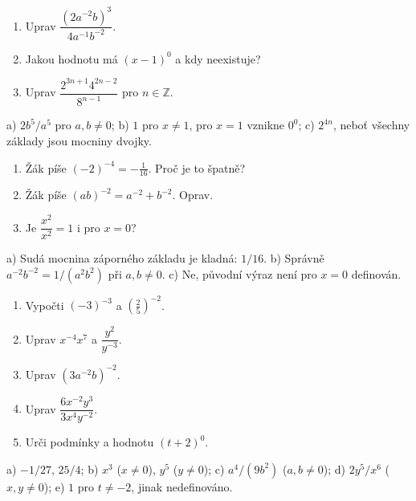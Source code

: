 \documentclass[11pt,a4paper]{article}
\begin{document}
\begin{zadaniReseniBox}[title={Rozšíření 1}]
\begin{enumerate}[label=\alph*)]
\item Uprav $\dfrac{(2a^{-2}b)^3}{4a^{-1}b^{-2}}$.
\item Jakou hodnotu má $(x-1)^0$ a kdy neexistuje?
\item Uprav $\dfrac{2^{3n+1}4^{2n-2}}{8^{n-1}}$ pro $n\in\mathbb Z$.
\end{enumerate}
\tcblower
 a) $2b^5/a^5$ pro $a,b\ne0$; b) $1$ pro $x\ne1$,
 pro $x=1$ vznikne $0^0$; c) $2^{4n}$, neboť všechny základy jsou mocniny dvojky.
\end{zadaniReseniBox}
\begin{zadaniReseniBox}[title={Rozšíření 2}]
\begin{enumerate}[label=\alph*)]
\item Žák píše $(-2)^{-4}=-\frac1{16}$. Proč je to špatně?
\item Žák píše $(ab)^{-2}=a^{-2}+b^{-2}$. Oprav.
\item Je $\dfrac{x^2}{x^2}=1$ i pro $x=0$?
\end{enumerate}
\tcblower
 a) Sudá mocnina záporného základu je kladná: $1/16$.
 b) Správně $a^{-2}b^{-2}=1/(a^2b^2)$ při $a,b\ne0$.
 c) Ne, původní výraz není pro $x=0$ definován.
\end{zadaniReseniBox}

\begin{zadaniReseniBox}[title={Domácí úkol}]
\begin{enumerate}[label=\alph*)]
\item Vypočti $(-3)^{-3}$ a $\left(\frac25\right)^{-2}$.
\item Uprav $x^{-4}x^7$ a $\dfrac{y^2}{y^{-3}}$.
\item Uprav $(3a^{-2}b)^ {-2}$.
\item Uprav $\dfrac{6x^{-2}y^3}{3x^4y^{-2}}$.
\item Urči podmínky a hodnotu $(t+2)^0$.
\end{enumerate}
\tcblower
 a) $-1/27$, $25/4$; b) $x^3$ ($x\ne0$), $y^5$ ($y\ne0$);
 c) $a^4/(9b^2)$ ($a,b\ne0$);
 d) $2y^5/x^6$ ($x,y\ne0$);
 e) $1$ pro $t\ne-2$, jinak nedefinováno.
\end{zadaniReseniBox}
\end{document}

